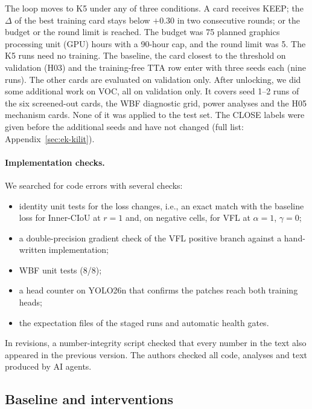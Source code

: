 \documentclass[pdflatex,iicol,sn-mathphys-num]{sn-jnl}
\begin{document}
The loop moves to K5 under any of three conditions. A card receives KEEP; the $\Delta$ of the best training card stays below $+0.30$ in two consecutive rounds; or the budget or the round limit is reached. The budget was 75 planned graphics processing unit (GPU) hours with a 90-hour cap, and the round limit was 5. The K5 runs need no training. The baseline, the card closest to the threshold on validation (H03) and the training-free TTA row enter with three seeds each (nine runs). The other cards are evaluated on validation only. After unlocking, we did some additional work on VOC, all on validation only. It covers seed 1--2 runs of the six screened-out cards, the WBF diagnostic grid, power analyses and the H05 mechanism cards. None of it was applied to the test set. The CLOSE labels were given before the additional seeds and have not changed (full list: Appendix~\ref{sec:ek-kilit}).

\paragraph{Implementation checks.}
We searched for code errors with several checks:
\begin{itemize}
\item identity unit tests for the loss changes, i.e., an exact match with the baseline loss for Inner-CIoU at $r=1$ and, on negative cells, for VFL at $\alpha=1$, $\gamma=0$;
\item a double-precision gradient check of the VFL positive branch against a hand-written implementation;
\item WBF unit tests (8/8);
\item a head counter on YOLO26n that confirms the patches reach both training heads;
\item the expectation files of the staged runs and automatic health gates.
\end{itemize}
In revisions, a number-integrity script checked that every number in the text also appeared in the previous version. The authors checked all code, analyses and text produced by AI agents.

\subsection{Baseline and interventions}\label{sec:mudahaleler}\label{sec:baseline-tanim}
\end{document}
